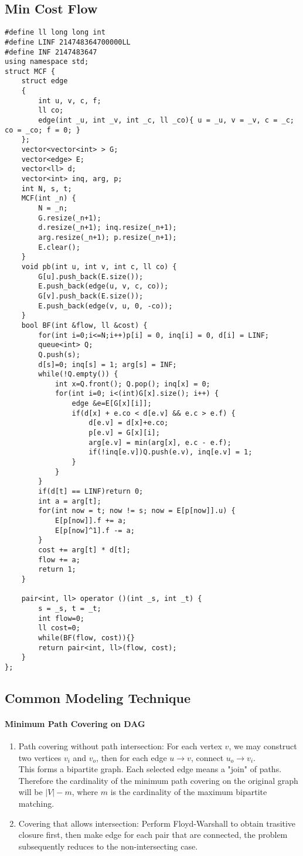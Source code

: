 \subsection{Min Cost Flow}
\begin{lstlisting}
#define ll long long int 
#define LINF 214748364700000LL
#define INF 2147483647
using namespace std;
struct MCF {
	struct edge
	{
		int u, v, c, f;
		ll co;
		edge(int _u, int _v, int _c, ll _co){ u = _u, v = _v, c = _c; co = _co; f = 0; }
	};
	vector<vector<int> > G;
	vector<edge> E;
	vector<ll> d;
	vector<int> inq, arg, p;
	int N, s, t;
	MCF(int _n) {
		N = _n;
		G.resize(_n+1);
		d.resize(_n+1); inq.resize(_n+1);
		arg.resize(_n+1); p.resize(_n+1);
		E.clear();
	}
	void pb(int u, int v, int c, ll co) {
		G[u].push_back(E.size());
		E.push_back(edge(u, v, c, co));
		G[v].push_back(E.size());
		E.push_back(edge(v, u, 0, -co));
	}
	bool BF(int &flow, ll &cost) {
		for(int i=0;i<=N;i++)p[i] = 0, inq[i] = 0, d[i] = LINF;
		queue<int> Q;
		Q.push(s);
		d[s]=0; inq[s] = 1; arg[s] = INF;
		while(!Q.empty()) {
			int x=Q.front(); Q.pop(); inq[x] = 0;
			for(int i=0; i<(int)G[x].size(); i++) {
				edge &e=E[G[x][i]];
				if(d[x] + e.co < d[e.v] && e.c > e.f) {
					d[e.v] = d[x]+e.co;
					p[e.v] = G[x][i];
					arg[e.v] = min(arg[x], e.c - e.f);
					if(!inq[e.v])Q.push(e.v), inq[e.v] = 1;
				}
			}
		}
		if(d[t] == LINF)return 0;
		int a = arg[t];
		for(int now = t; now != s; now = E[p[now]].u) {
			E[p[now]].f += a;
			E[p[now]^1].f -= a;
		}
		cost += arg[t] * d[t];
		flow += a;
		return 1;
	}

	pair<int, ll> operator ()(int _s, int _t) {
		s = _s, t = _t;
		int flow=0;
		ll cost=0;
		while(BF(flow, cost)){}
		return pair<int, ll>(flow, cost);
	}
};
\end{lstlisting}
\subsection{Common Modeling Technique}
\paragraph{Minimum Path Covering on DAG}
\begin{enumerate}
\item Path covering without path intersection: For each vertex $v$, we may construct two vertices $v_i$ and $v_o$, then for each edge $u\rightarrow v$, connect $u_o\rightarrow v_i$. \\
This forms a bipartite graph. Each selected edge means a "join" of paths. Therefore the cardinality of the minimum path covering on the original graph will be $|V| - m$, where $m$ is the cardinality of the maximum bipartite matching.
\item Covering that allows intersection: Perform Floyd-Warshall to obtain trasitive closure first, then make edge for each pair that are connected, the problem subsequently reduces to the non-intersecting case.
\end{enumerate}
